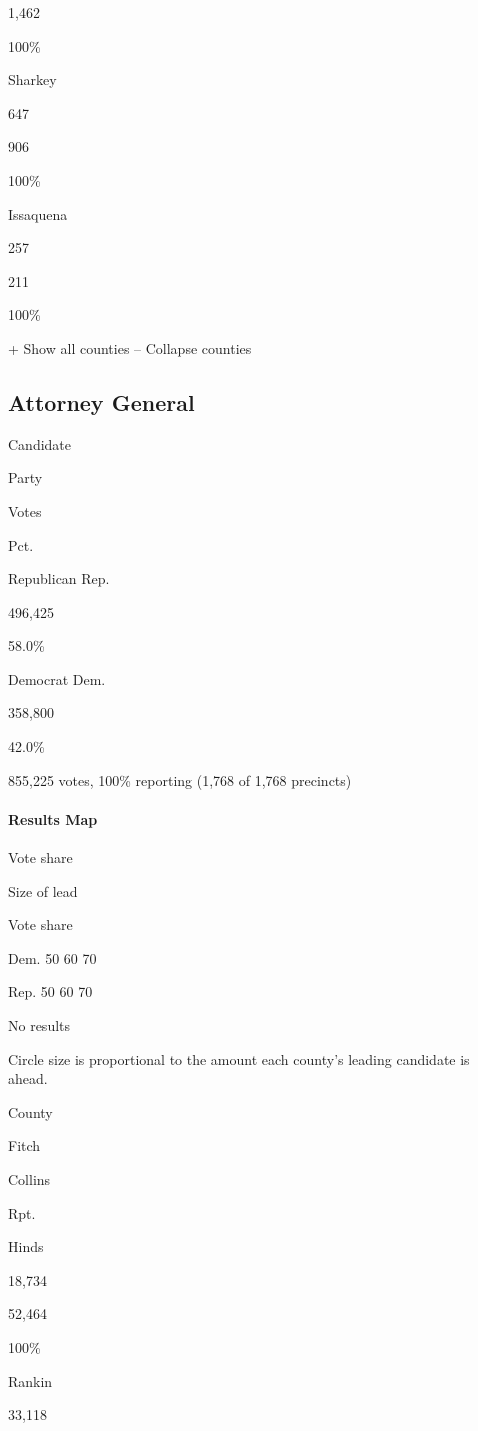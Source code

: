 1,462

100\%

Sharkey

647

906

100\%

Issaquena

257

211

100\%

+ Show all counties -- Collapse counties

\hypertarget{attorney-general}{%
\subsection{Attorney General}\label{attorney-general}}

Candidate

Party

Votes

Pct.

Republican Rep.

496,425

58.0\%

Democrat Dem.

358,800

42.0\%

855,225 votes, 100\% reporting (1,768 of 1,768 precincts)

\hypertarget{results-map-2}{%
\paragraph{Results Map}\label{results-map-2}}

Vote share

Size of lead

Vote share

Dem. 50 60 70

Rep. 50 60 70

No results

Circle size is proportional to the amount each county's leading
candidate is ahead.

County

Fitch

Collins

Rpt.

Hinds

18,734

52,464

100\%

Rankin

33,118

